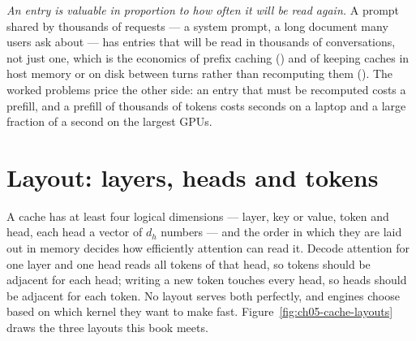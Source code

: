 \emph{An entry is valuable in proportion to how often it will be read again.}
A prompt shared by thousands of requests --- a system prompt, a long document
many users ask about --- has entries that will be read in thousands of
conversations, not just one, which is the economics of prefix caching
() and of keeping caches in host memory or on disk
between turns rather than recomputing them (). The
worked problems price the other side: an entry that must be recomputed costs a
prefill, and a prefill of thousands of tokens costs seconds on a laptop and a
large fraction of a second on the largest GPUs.

\section{Layout: layers, heads and tokens}

A cache has at least four logical dimensions --- layer, key or value, token
and head, each head a vector of $d_h$ numbers --- and the order in which they
are laid out in memory decides how efficiently attention can read it. Decode
attention for one layer and one head reads all tokens of that head, so tokens
should be adjacent for each head; writing a new token touches every head, so
heads should be adjacent for each token. No layout serves both perfectly, and
engines choose based on which kernel they want to make fast.
Figure~\ref{fig:ch05-cache-layouts} draws the three layouts this book meets.


